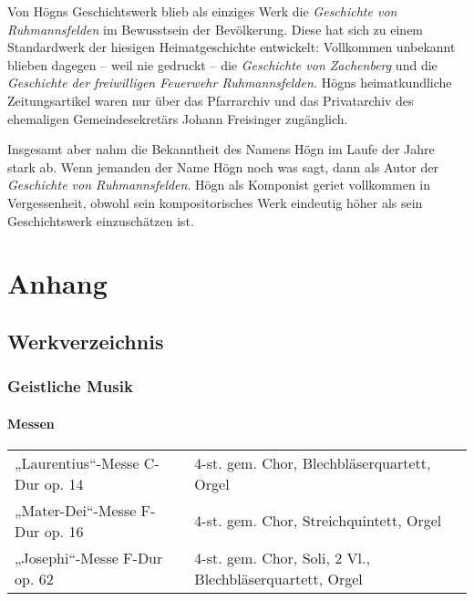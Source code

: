 \documentclass{book}
\begin{document}
Von Högns Geschichtswerk blieb als einziges Werk die \textit{Geschichte
von Ruh\-mannsfelden} im Bewusstsein der Bevölkerung. Diese hat sich zu
einem Stan\-dardwerk der hiesigen Heimatgeschichte entwickelt:
Vollkommen unbekannt blieben dagegen – weil nie gedruckt – die
\textit{Geschichte von Zachenberg} und die \textit{Geschichte der
freiwilligen Feuerwehr Ruhmannsfelden.} Högns heimatkundliche
Zei\-tungsartikel waren nur über das Pfarrarchiv und das Privatarchiv
des ehema\-ligen Gemeindesekretärs Johann Freisinger zugänglich.

Insgesamt aber nahm die Bekanntheit des Namens Högn im Laufe der Jahre
stark ab. Wenn jemanden der Name Högn noch was sagt, dann als Au\-tor
der \textit{Geschichte von Ruhmannsfelden}. Högn als Komponist geriet
vollkommen in Vergessenheit, obwohl sein kompositorisches Werk
eindeutig höher als sein Geschichtswerk einzuschätzen ist.





\chapter{Anhang}
\section{Werkverzeichnis}

\subsection{Geistliche Musik}



\subsubsection{Messen}

\begin{tabular}{ll}
„Laurentius“-Messe C-Dur op. 14 &
4-st. gem. Chor, Blechbläserquartett, Orgel\\

„Mater-Dei“-Messe F-Dur op. 16 &
4-st. gem. Chor, Streichquintett, Orgel\\

„Josephi“-Messe F-Dur op. 62 &
4-st. gem. Chor, Soli, 2 Vl., Blechbläser\-quartett, Orgel\\
\end{tabular}
\end{document}
